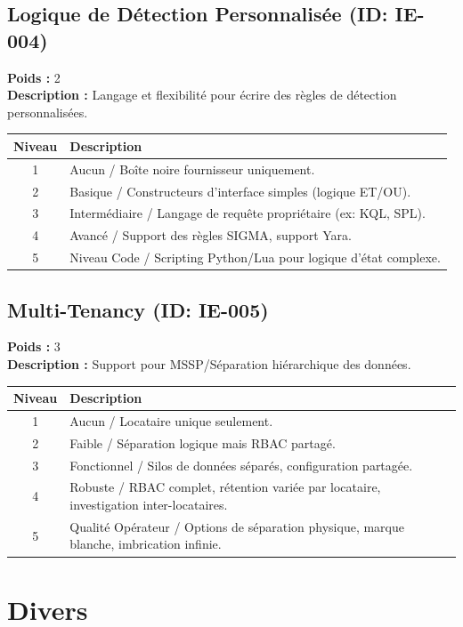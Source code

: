 \documentclass{article}
\begin{document}
\subsection{Logique de Détection Personnalisée (ID: IE-004)}
\textbf{Poids :} 2 \\
\textbf{Description :} Langage et flexibilité pour écrire des règles de détection personnalisées.
\vspace{0.3cm}
\begin{longtable}{|c|p{12cm}|}
\hline
\rowcolor{lightgray} \textbf{Niveau} & \textbf{Description} \\ \hline
1 & Aucun / Boîte noire fournisseur uniquement. \\ \hline
2 & Basique / Constructeurs d'interface simples (logique ET/OU). \\ \hline
3 & Intermédiaire / Langage de requête propriétaire (ex: KQL, SPL). \\ \hline
4 & Avancé / Support des règles SIGMA, support Yara. \\ \hline
5 & Niveau Code / Scripting Python/Lua pour logique d'état complexe. \\ \hline
\end{longtable}
\vspace{0.5cm}
\subsection{Multi-Tenancy (ID: IE-005)}
\textbf{Poids :} 3 \\
\textbf{Description :} Support pour MSSP/Séparation hiérarchique des données.
\vspace{0.3cm}
\begin{longtable}{|c|p{12cm}|}
\hline
\rowcolor{lightgray} \textbf{Niveau} & \textbf{Description} \\ \hline
1 & Aucun / Locataire unique seulement. \\ \hline
2 & Faible / Séparation logique mais RBAC partagé. \\ \hline
3 & Fonctionnel / Silos de données séparés, configuration partagée. \\ \hline
4 & Robuste / RBAC complet, rétention variée par locataire, investigation inter-locataires. \\ \hline
5 & Qualité Opérateur / Options de séparation physique, marque blanche, imbrication infinie. \\ \hline
\end{longtable}
\vspace{0.5cm}
\section{Divers}
\end{document}
